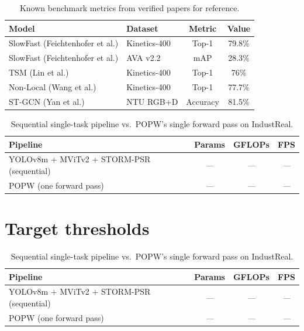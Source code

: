 \documentclass[11pt,a4paper]{article}
\newcommand{\popw}{POPW}
\newcommand{\industreal}{IndustReal}
\newcommand{\todo}{\textit{---}}              %
\newcommand{\popwres}{\todo}                  %
\begin{document}
\begin{table}[!htbp]
\centering
\small
\caption{Known benchmark metrics from verified papers for reference.}
\label{tab:verified-metrics}
\renewcommand{\arraystretch}{1.15}
\begin{tabular}{l l c c}
\toprule
\textbf{Model} & \textbf{Dataset} & \textbf{Metric} & \textbf{Value} \\
\midrule
SlowFast (Feichtenhofer et al.) & Kinetics-400 & Top-1 & 79.8\% \\
SlowFast (Feichtenhofer et al.) & AVA v2.2 & mAP & 28.3\% \\
TSM (Lin et al.) & Kinetics-400 & Top-1 & 76\% \\
Non-Local (Wang et al.) & Kinetics-400 & Top-1 & 77.7\% \\
ST-GCN (Yan et al.) & NTU RGB+D & Accuracy & 81.5\% \\
\bottomrule
\end{tabular}
\end{table}

\begin{table}[!htbp]
\centering
\small
\caption{Sequential single-task pipeline vs.\ \popw{}'s single forward pass on \industreal{}.}
\label{tab:multi-model}
\renewcommand{\arraystretch}{1.15}
\begin{tabular}{l c c c}
\toprule
\textbf{Pipeline} & \textbf{Params} & \textbf{GFLOPs} & \textbf{FPS} \\
\midrule
YOLOv8m + MViTv2 + STORM-PSR (sequential) & {\todo} & {\todo} & {\todo} \\
\popw{} (one forward pass)                & \popwres & \popwres & \popwres \\
\bottomrule
\end{tabular}
\end{table}

\FloatBarrier
\section{Target thresholds}

\begin{table}[!htbp]
\centering
\small
\caption{Sequential single-task pipeline vs.\ \popw{}'s single forward pass on \industreal{}.}
\label{tab:multi-model}
\renewcommand{\arraystretch}{1.15}
\begin{tabular}{l c c c}
\toprule
\textbf{Pipeline} & \textbf{Params} & \textbf{GFLOPs} & \textbf{FPS} \\
\midrule
YOLOv8m + MViTv2 + STORM-PSR (sequential) & {\todo} & {\todo} & {\todo} \\
\popw{} (one forward pass)                & \popwres & \popwres & \popwres \\
\bottomrule
\end{tabular}
\end{table}
\end{document}
